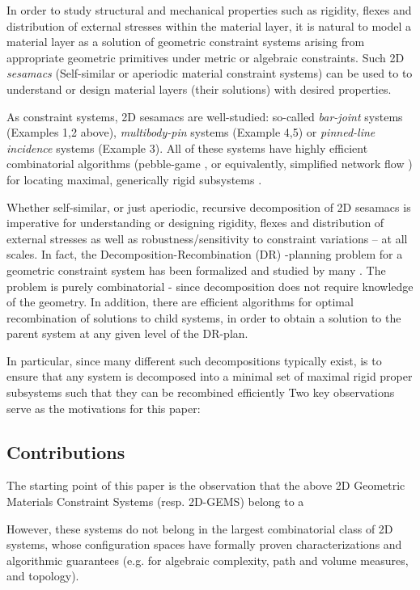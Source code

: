 In order to study structural and mechanical properties such as rigidity, flexes and distribution of external stresses 
within the material layer, it is natural to model a material layer as a solution of geometric constraint systems 
arising from appropriate geometric primitives under metric or algebraic constraints. 
Such  2D {\em sesamacs} (Self-similar or aperiodic material constraint systems) can be used to 
to understand or design material layers (their solutions) with desired properties.

As constraint systems, 2D sesamacs  are  well-studied: so-called
{\it bar-joint} systems (Examples 1,2 above), {\it multibody-pin} systems (Example 4,5) or {\it pinned-line incidence} systems (Example 3).  
All of these systems have highly efficient combinatorial algorithms (pebble-game \cite{XX}, or equivalently, simplified network flow \cite{XX}) 
for locating maximal, generically rigid subsystems \cite{XX}.

Whether self-similar, or just aperiodic, recursive decomposition of 2D sesamacs 
is imperative for understanding or designing rigidity, flexes and distribution 
of external stresses as well as robustness/sensitivity to constraint variations -- at all scales. 
In fact, the Decomposition-Recombination (DR)
-planning problem  for a geometric constraint system has been formalized \cite{XX} and 
studied by many \cite{XX}. The problem is purely combinatorial  - since decomposition does not require
knowledge of the geometry. In addition, there are efficient  algorithms 
for optimal recombination of solutions to child systems, in order to obtain a solution to the parent system at any
given level of the DR-plan.

In particular, since many different such decompositions typically exist, is to ensure 
that any system is decomposed into a minimal set 
of maximal rigid proper subsystems  
such that they can be recombined efficiently 
 Two key observations serve as the motivations for this paper:


\subsection{Contributions}

The starting point of this paper is the observation that the above 2D Geometric Materials Constraint Systems (resp. 2D-GEMS) 
belong to a  

However, these systems do not 
belong in the largest combinatorial class of 2D systems, whose configuration spaces have formally proven  characterizations and 
algorithmic guarantees (e.g. for algebraic complexity, path and volume measures, and  topology).

